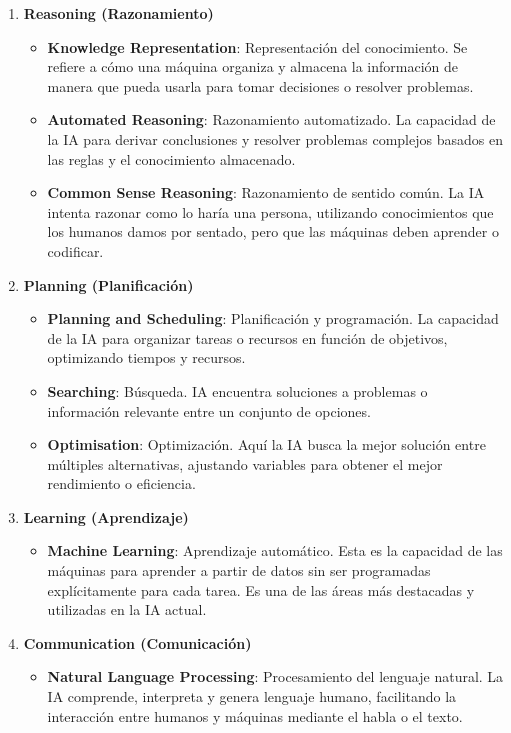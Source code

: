 \begin{enumerate}
\item \textbf{Reasoning (Razonamiento)}
  \begin{itemize}
    \item \textbf{Knowledge Representation}: Representación del conocimiento. Se refiere a cómo una máquina organiza y almacena la información de manera que pueda usarla para tomar decisiones o resolver problemas.
    \item \textbf{Automated Reasoning}: Razonamiento automatizado. La capacidad de la IA para derivar conclusiones y resolver problemas complejos basados en las reglas y el conocimiento almacenado.
    \item \textbf{Common Sense Reasoning}: Razonamiento de sentido común. La IA intenta razonar como lo haría una persona, utilizando conocimientos que los humanos damos por sentado, pero que las máquinas deben aprender o codificar.
  \end{itemize}

\item \textbf{Planning (Planificación)}
  \begin{itemize}
    \item \textbf{Planning and Scheduling}: Planificación y programación. La capacidad de la IA para organizar tareas o recursos en función de objetivos, optimizando tiempos y recursos.
    \item \textbf{Searching}: Búsqueda. IA encuentra soluciones a problemas o información relevante entre un conjunto de opciones.
    \item \textbf{Optimisation}: Optimización. Aquí la IA busca la mejor solución entre múltiples alternativas, ajustando variables para obtener el mejor rendimiento o eficiencia.
  \end{itemize}

\item \textbf{Learning (Aprendizaje)}
  \begin{itemize}
    \item \textbf{Machine Learning}: Aprendizaje automático. Esta es la capacidad de las máquinas para aprender a partir de datos sin ser programadas explícitamente para cada tarea. Es una de las áreas más destacadas y utilizadas en la IA actual.
  \end{itemize}

\item \textbf{Communication (Comunicación)}
  \begin{itemize}
    \item \textbf{Natural Language Processing}: Procesamiento del lenguaje natural. La IA comprende, interpreta y genera lenguaje humano, facilitando la interacción entre humanos y máquinas mediante el habla o el texto.
  \end{itemize}


\end{enumerate}
